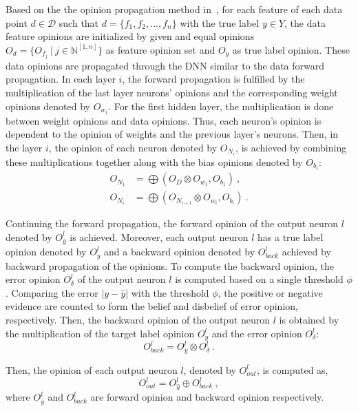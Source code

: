 Based on the the opinion propagation method in~\cite{hope}, for each feature of each data point $d \in \mathcal{D}$ such that $d=\{f_1,f_2,...,f_n\}$ with the true label $y \in Y$, the data feature opinions are initialized by given and equal opinions $O_d = \{O_{f_j}\ |\ j \in \mathbb{N}^{[1,n]}\}$ as feature opinion set and $O_y$ as true label opinion. These data opinions are propagated through the DNN similar to the data forward propagation. In each layer $i$, the forward propagation is fulfilled by the multiplication of the last layer neurons' opinions and the corresponding weight opinions denoted by $O_{w_i}$. For the first hidden layer, the multiplication is done between weight opinions and data opinions. {\color{blue} Thus, each neuron's opinion is dependent to the opinion of weights and the previous layer's neurons.} Then, in the layer $i$, the opinion of each neuron denoted by $O_{N_i}$, is achieved by combining these multiplications together along with the bias opinions denoted by $O_{b_i}$:
\begin{align}
O_{N_1} &= \bigoplus(O_{D} \otimes O_{w_1}, O_{b_1})\ , \\
O_{N_i} &= \bigoplus(O_{N_{i-1}} \otimes O_{w_i}, O_{b_i})\ .
\end{align}

Continuing the forward propagation, the forward opinion of the output neuron $l$ denoted by $O_{\hat{y}}^l$ is achieved. Moreover, each output neuron $l$ has a true label opinion denoted by $O_y^l$ and a backward opinion denoted by $O_{back}^l$ achieved by backward propagation of the opinions. To compute the backward opinion, the error opinion $O_{\delta}^l$ of the output neuron $l$ is computed based on a single threshold $\phi$. Comparing the error $|y-\hat{y}|$ with the threshold $\phi$, the positive or negative evidence are counted to form the belief and disbelief of error opinion, respectively. Then, the backward opinion of the output neuron $l$ is obtained by the multiplication of the target label opinion $O_y^l$ and the error opinion $O_{\delta}^l$:
\begin{equation}
O_{back}^l = O_y^l \otimes O_{\delta}^l\ .
\label{backward_op}
\end{equation}

Then, the opinion of each output neuron $l$, denoted by $O_{out}^l$, is computed as,
\begin{equation}
O_{out}^l = O_{\hat{y}}^l \oplus O_{back}^l\ ,
\label{out_eq}
\end{equation}
where $O_{\hat{y}}^l$ and $O_{back}^l$ are forward opinion and backward opinion respectively. 

